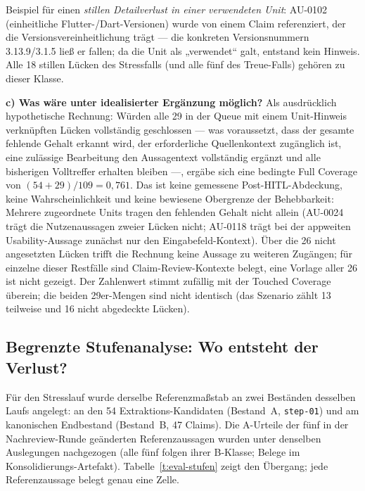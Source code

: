 Beispiel für einen \emph{stillen Detailverlust in einer
verwendeten Unit}: AU-0102 (einheitliche Flutter-/Dart-Versionen)
wurde von einem Claim referenziert, der die
Versionsvereinheitlichung trägt --- die konkreten Versionsnummern
3.13.9/3.1.5 ließ er fallen; da die Unit als „verwendet`` galt,
entstand kein Hinweis. Alle 18 stillen Lücken des Stressfalls
(und alle fünf des Treue-Falls) gehören zu dieser Klasse.

\textbf{c) Was wäre unter idealisierter Ergänzung möglich?} Als
ausdrücklich hypothetische Rechnung: Würden alle 29 in der Queue
mit einem Unit-Hinweis verknüpften Lücken vollständig geschlossen
--- was voraussetzt, dass der gesamte fehlende Gehalt erkannt
wird, der erforderliche Quellenkontext zugänglich ist, eine
zulässige Bearbeitung den Aussagentext vollständig ergänzt und
alle bisherigen Volltreffer erhalten bleiben ---, ergäbe sich eine
bedingte Full Coverage von $(54+29)/109 = 0{,}761$. Das ist keine
gemessene Post-HITL-Abdeckung, keine Wahrscheinlichkeit und keine
bewiesene Obergrenze der Behebbarkeit: Mehrere zugeordnete Units
tragen den fehlenden Gehalt nicht allein (AU-0024 trägt die
Nutzenaussagen zweier Lücken nicht; AU-0118 trägt bei der
appweiten Usability-Aussage zunächst nur den
Eingabefeld-Kontext). Über die 26 nicht angesetzten Lücken trifft
die Rechnung keine Aussage zu weiteren Zugängen; für einzelne
dieser Restfälle sind Claim-Review-Kontexte belegt, eine Vorlage
aller 26 ist nicht gezeigt. Der Zahlenwert stimmt
zufällig mit der Touched Coverage überein; die beiden 29er-Mengen
sind nicht identisch (das Szenario zählt 13 teilweise und 16
nicht abgedeckte Lücken).

\subsection{Begrenzte Stufenanalyse: Wo entsteht der Verlust?}
\label{sec:eval-stufen}

Für den Stresslauf wurde derselbe Referenzmaßstab an zwei
Beständen desselben Laufs angelegt: an den 54 Extraktions-Kandidaten
(Bestand~A, \texttt{step-01}) und am kanonischen Endbestand
(Bestand~B, 47 Claims). Die A-Urteile der fünf in der
Nachreview-Runde geänderten Referenzaussagen wurden unter
denselben Auslegungen nachgezogen (alle fünf folgen ihrer
B-Klasse; Belege im Konsolidierungs-Artefakt).
Tabelle~\ref{t:eval-stufen} zeigt den Übergang; jede
Referenzaussage belegt genau eine Zelle.



